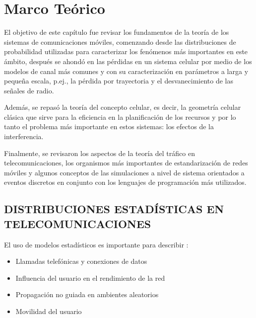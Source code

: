 
\chapter{Marco Teórico} %

\label{Chapter2} 

El objetivo de este capítulo fue revisar los fundamentos de la teoría de los sistemas de comunicaciones móviles, comenzando desde las distribuciones de probabilidad utilizadas para caracterizar los fenómenos más importantes en este ámbito, después se ahondó en las pérdidas en un sistema celular por medio de los modelos de canal más comunes y con su caracterización en parámetros a larga y pequeña escala, p.ej., la pérdida por trayectoria y el desvanecimiento de las señales de radio.\newline

Además, se repasó la teoría del concepto celular, es decir, la geometría celular clásica que sirve para la eficiencia en la planificación de los recursos y por lo tanto el problema más importante en estos sistemas: los efectos de la interferencia. \newline

Finalmente, se revisaron los aspectos de la teoría del tráfico en telecomunicaciones, los organismos más importantes de estandarización de redes móviles y algunos conceptos de las simulaciones a nivel de sistema orientados a eventos discretos en conjunto con los lenguajes de programación más utilizados.\newline



\section{DISTRIBUCIONES ESTADÍSTICAS EN TELECOMUNICACIONES}

El uso de modelos estadísticos es importante para describir \parencite{Correia2018}:
\begin{itemize}
    \item Llamadas telefónicas y conexiones de datos
    \item Influencia del usuario en el rendimiento de la red
    \item Propagación no guiada en ambientes aleatorios
    \item Movilidad del usuario
\end{itemize}


